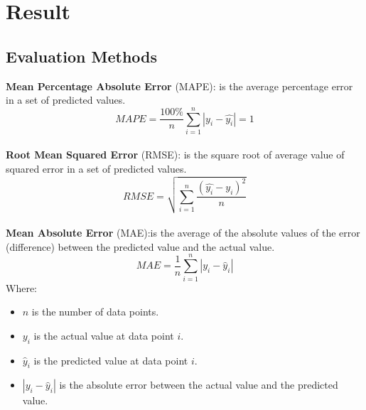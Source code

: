 \documentclass{ieeeojies}
\begin{document}
\section{Result}
\subsection{Evaluation Methods}
\textbf{Mean Percentage Absolute Error} (MAPE): is the average percentage error in a set of predicted values.\\
\[MAPE=\frac{100\%}{n}  \sum_{i=1}^{n} |y_i-\hat{y_i} |  = 1 \]\\
\textbf{Root Mean Squared Error} (RMSE): is the square root of average value of squared error in a set of predicted values.\\
\[RMSE=\sqrt{\sum_{i=1}^{n} \frac{(\hat{y_i}-y_i )^2}{n} }\]\\
\textbf{Mean Absolute Error} (MAE):is the average of the absolute values of the error (difference) between the predicted value and the actual value.\\
\[MAE=\frac{1}{n} \sum_{i=1}^{n} \left| y_i - \hat{y}_i \right|\]
Where:\\
\begin{itemize}
    \item \( n \) is the number of data points.
    \item \( y_i \) is the actual value at data point \( i \).
    \item \( \hat{y}_i \) is the predicted value at data point \( i \).
    \item \( \left| y_i - \hat{y}_i \right| \) is the absolute error between the actual value and the predicted value.
\end{itemize}
\end{document}
